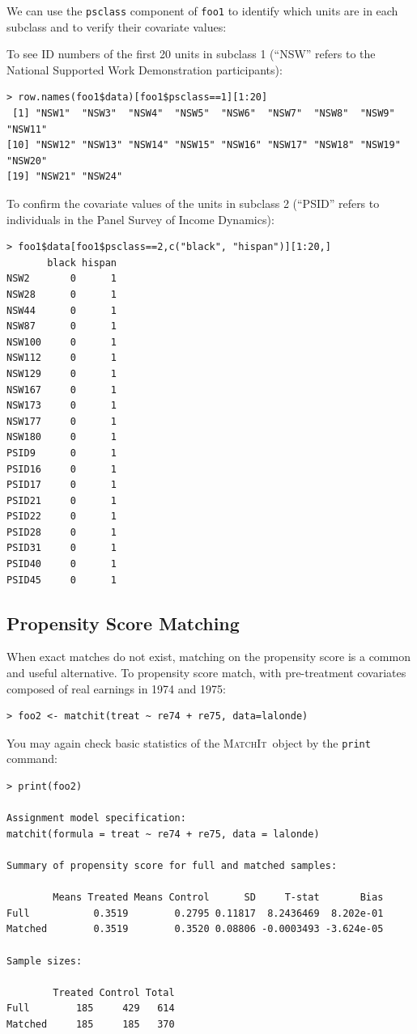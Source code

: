 \documentclass[oneside,letterpaper,titlepage]{article}
\newcommand{\MatchIt}{\textsc{MatchIt}}
\begin{document}
We can use the {\tt psclass} component of {\tt foo1} to identify which units are in each subclass and to verify their covariate values:

To see ID numbers of the first 20 units in subclass 1 (``NSW'' refers to the National Supported Work Demonstration participants):
\begin{verbatim}
> row.names(foo1$data)[foo1$psclass==1][1:20]
 [1] "NSW1"  "NSW3"  "NSW4"  "NSW5"  "NSW6"  "NSW7"  "NSW8"  "NSW9"  "NSW11"
[10] "NSW12" "NSW13" "NSW14" "NSW15" "NSW16" "NSW17" "NSW18" "NSW19" "NSW20"
[19] "NSW21" "NSW24"
\end{verbatim}

To confirm the covariate values of the units in subclass 2 (``PSID'' refers to individuals in the Panel Survey of Income Dynamics):
\begin{verbatim}
> foo1$data[foo1$psclass==2,c("black", "hispan")][1:20,]
       black hispan
NSW2       0      1
NSW28      0      1
NSW44      0      1
NSW87      0      1
NSW100     0      1
NSW112     0      1
NSW129     0      1
NSW167     0      1
NSW173     0      1
NSW177     0      1
NSW180     0      1
PSID9      0      1
PSID16     0      1
PSID17     0      1
PSID21     0      1
PSID22     0      1
PSID28     0      1
PSID31     0      1
PSID40     0      1
PSID45     0      1
\end{verbatim}


\subsection{Propensity Score Matching}

When exact matches do not exist, matching on the propensity score is a
common and useful alternative.  To propensity score match, with
pre-treatment covariates composed of real earnings in 1974 and 1975:

\begin{verbatim}
> foo2 <- matchit(treat ~ re74 + re75, data=lalonde)
\end{verbatim} 


You may again check basic statistics of the \MatchIt\ object by the
\texttt{print} command:

\begin{verbatim}
> print(foo2)
 
Assignment model specification:
matchit(formula = treat ~ re74 + re75, data = lalonde)
 
Summary of propensity score for full and matched samples:
 
        Means Treated Means Control      SD     T-stat       Bias
Full           0.3519        0.2795 0.11817  8.2436469  8.202e-01
Matched        0.3519        0.3520 0.08806 -0.0003493 -3.624e-05
 
Sample sizes:
 
        Treated Control Total
Full        185     429   614
Matched     185     185   370
 
\end{verbatim} 
\end{document}

